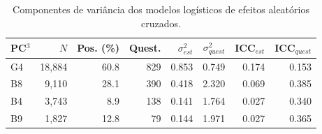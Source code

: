 \begin{table}[H]
\centering\footnotesize
\caption{Componentes de variância dos modelos logísticos de efeitos aleatórios cruzados.}
\label{tab:glmm_variancia}
\begin{tabular}{l rrrrrrr}
\toprule
PC$^3$ & $N$ & Pos. (\%) & Quest. & $\sigma^2_{est}$ & $\sigma^2_{quest}$ & ICC$_{est}$ & ICC$_{quest}$ \\
\midrule
G4 & 18,884 & 60.8 & 829 & 0.853 & 0.749 & 0.174 & 0.153 \\
B8 & 9,110 & 28.1 & 390 & 0.418 & 2.320 & 0.069 & 0.385 \\
B4 & 3,743 & 8.9 & 138 & 0.141 & 1.764 & 0.027 & 0.340 \\
B9 & 1,827 & 12.8 & 79 & 0.144 & 1.971 & 0.027 & 0.365 \\
\bottomrule
\end{tabular}
\end{table}
